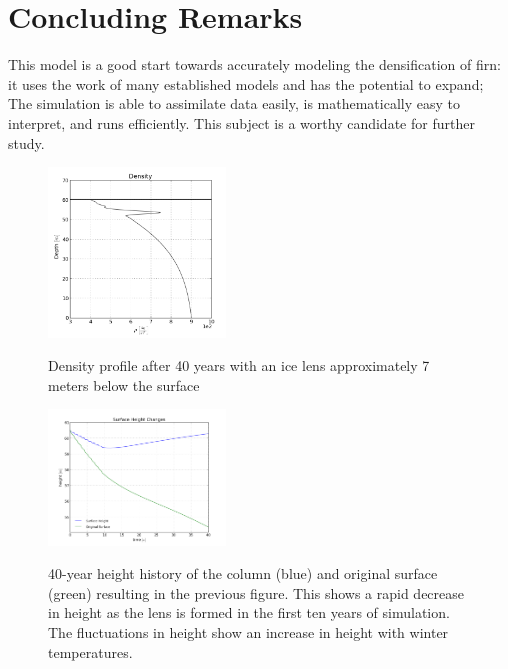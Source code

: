 \documentclass{article}%
\begin{document}
\section{Concluding Remarks}
This model is a good start towards accurately modeling the densification of firn: it uses the work of many established models and has the potential to expand;  The simulation is able to assimilate data easily, is mathematically easy to interpret, and runs efficiently.  This subject is a worthy candidate for further study.  

\begin{figure}[H]
	\centering
		\includegraphics[width=0.42\textwidth]{images/40yrDen.png}
	\label{fig:500 year orbit}
	\caption{\footnotesize Density profile after 40 years with an ice lens approximately 7 meters below the surface}
\end{figure}

\begin{figure}[H]
	\centering
		\includegraphics[width=0.42\textwidth]{images/40yrHt.png}
	\label{fig:500 year orbit}
	\caption{\footnotesize 40-year height history of the column (blue) and original surface (green) resulting in the previous figure.  This shows a rapid decrease in height as the lens is formed in the first ten years of simulation.  The fluctuations in height show an increase in height with winter temperatures.}
\end{figure}
\end{document}
